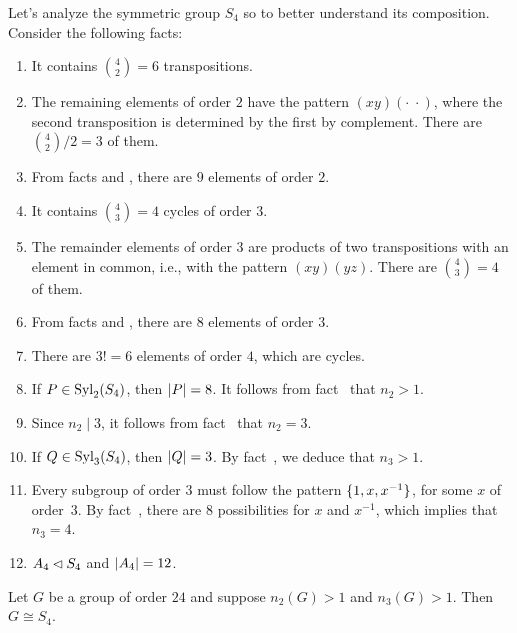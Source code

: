\begin{xmpl}
    Let's analyze the symmetric group $S_4$ so to better understand its composition. Consider the following facts:
    \begin{enumerate}[\upshape 1.]
        \item It contains $\binom42=6$ transpositions.
        \item The remaining elements of order $2$ have the pattern $(xy)(\cdot\;\cdot)$, where the second transposition is determined by the first by complement. There are $\binom42/2=3$ of them.
        \item From facts {} and {}, there are $9$ elements of order $2$.
        \item It contains $\binom43=4$ cycles of order $3$.
        \item The remainder elements of order $3$ are products of two transpositions with an element in common, i.e., with the pattern $(xy)(yz)$. There are $\binom43=4$ of them.
        \item From facts {} and {}, there are $8$ elements of order $3$.
        \item There are $3!=6$ elements of order $4$, which are cycles.
        \item If $P\in{\rm Syl}_2(S_4)$, then $\left\vert{P}\right\vert=8$. It follows from fact~{} that $n_2>1$.
        \item Since $n_2\mid 3$, it follows from fact~{} that $n_2=3$.
        \item If $Q\in{\rm Syl}_3(S_4)$, then $\left\vert{Q}\right\vert=3$. By fact~{}, we deduce that $n_3>1$.
        \item Every subgroup of order $3$ must follow the pattern $\{1,x,x^{-1}\}$, for some\/ $x$ of order\/~$3$. By fact~{}, there are\/ $8$ possibilities for\/ $x$ and\/ $x^{-1}$, which implies that\/ $n_3=4$.
        \item $A_4\lhd S_4$ and $\left\vert{A_4}\right\vert=12$.
    \end{enumerate}
\end{xmpl}

\begin{thm}\label{thm-24}
    Let\/ $G$ be a group of order $24$ and suppose\/ $n_2(G)>1$ and\/ $n_3(G)>1$. Then $G\cong S_4$.
\end{thm}

